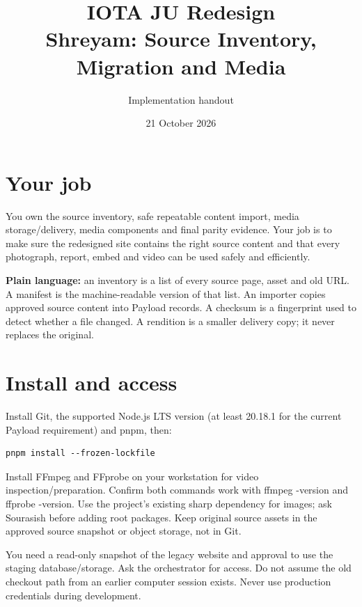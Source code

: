 \documentclass[11pt]{article}
\title{IOTA JU Redesign\\Shreyam: Source Inventory, Migration and Media}
\author{Implementation handout}
\date{21 October 2026}
\begin{document}
\maketitle

\section{Your job}
You own the source inventory, safe repeatable content import, media storage/delivery, media components and final parity evidence. Your job is to make sure the redesigned site contains the right source content and that every photograph, report, embed and video can be used safely and efficiently.

\textbf{Plain language:} an inventory is a list of every source page, asset and old URL. A manifest is the machine-readable version of that list. An importer copies approved source content into Payload records. A checksum is a fingerprint used to detect whether a file changed. A rendition is a smaller delivery copy; it never replaces the original.

\section{Install and access}
Install Git, the supported Node.js LTS version (at least 20.18.1 for the current Payload requirement) and pnpm, then:
\begin{verbatim}
pnpm install --frozen-lockfile
\end{verbatim}
Install FFmpeg and FFprobe on your workstation for video inspection/preparation. Confirm both commands work with ffmpeg -version and ffprobe -version. Use the project's existing sharp dependency for images; ask Sourasish before adding root packages. Keep original source assets in the approved source snapshot or object storage, not in Git.

You need a read-only snapshot of the legacy website and approval to use the staging database/storage. Ask the orchestrator for access. Do not assume the old checkout path from an earlier computer session exists. Never use production credentials during development.
\end{document}
